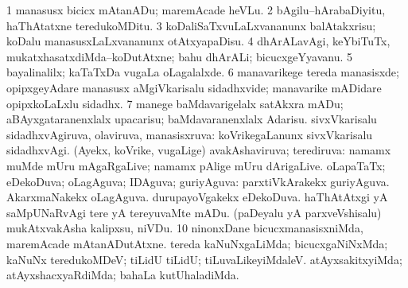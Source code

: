 \noindent
\gl{\pagu}
\bmng
\bnum
\num{1}  manasusx bicicx mAtanADu; maremAcade heVLu. 
\num{2}  bAgilu--hArabaDiyitu, haThAtatxne teredukoMDitu. 
\num{3}  koDaliSaTxvuLaLxvananunx balAtakxrisu; koDalu manasusxLaLxvananunx otAtxyapaDisu. 
\num{4}  dhArALavAgi, keYbiTuTx, mukatxhasatxdiMda--koDutAtxne; bahu dhArALi; bicucxgeYyavanu. 
\num{5}  bayalinalilx; kaTaTxDa \mo vugaLa oLagalalxde. 
\num{6}  manavarikege tereda manasisxde; opipxgeyAdare manasusx aMgiVkarisalu sidadhxvide; manavarike mADidare opipxkoLaLxlu sidadhx. 
\num{7}  manege baMdavarigelalx satAkxra mADu; aBAyxgataranenxlalx upacarisu; baMdavaranenxlalx Adarisu. 
  
\banum
{} sivxVkarisalu sidadhxvAgiruva, olaviruva, manasisxruva:  koVrikegaLanunx sivxVkarisalu sidadhxvAgi. 
 (Ayekx, koVrike, \mo vugaLige) avakAshaviruva; terediruva:  namamx muMde mUru mAgaRgaLive; namamx pAlige mUru dArigaLive. 
 oLapaTaTx; eDekoDuva; oLagAguva; IDAguva; guriyAguva:  parxtiVkArakekx guriyAguva.  AkarxmaNakekx oLagAguva.  durupayoVgakekx eDekoDuva. 
\eanum
\numie
{}  
\banum
{} haThAtAtxgi yA saMpUNaRvAgi tere yA tereyuvaMte mADu. 
 (paDeyalu yA parxveVshisalu) mukAtxvakAsha kalipxsu, niVDu. 
\eanum
\numie
\num{10}  ninonxDane bicucxmanasisxniMda, maremAcade mAtanADutAtxne. 
  
\banum
{} tereda kaNuNxgaLiMda; bicucxgaNiNxMda; kaNuNx teredukoMDeV; tiLidU tiLidU; tiLuvaLikeyiMdaleV. 
 atAyxsakitxyiMda; atAyxshacxyaRdiMda; bahaLa kutUhaladiMda. 
\eanum
\numie
\enum
\emng
\eentry
 
